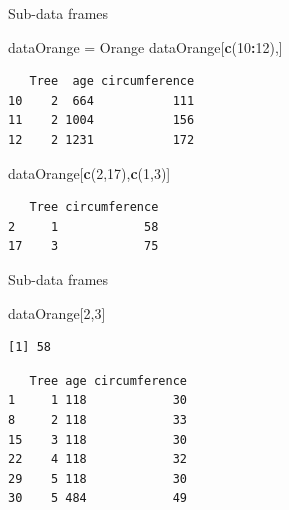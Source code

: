\documentclass[
  ignorenonframetext,
  aspectratio=169]{beamer}
\newenvironment{Shaded}{\begin{snugshade}}{\end{snugshade}}
\newcommand{\DecValTok}[1]{\textcolor[rgb]{0.00,0.00,0.81}{#1}}
\newcommand{\FunctionTok}[1]{\textcolor[rgb]{0.13,0.29,0.53}{\textbf{#1}}}
\newcommand{\NormalTok}[1]{#1}
\newcommand{\OtherTok}[1]{\textcolor[rgb]{0.56,0.35,0.01}{#1}}
\newcommand{\SpecialCharTok}[1]{\textcolor[rgb]{0.81,0.36,0.00}{\textbf{#1}}}
\begin{document}
\begin{frame}[fragile]{Sub-data frames}
\label{sub-data-frames-1}
\begin{Shaded}
\begin{Highlighting}[]
\NormalTok{dataOrange }\OtherTok{=}\NormalTok{ Orange}
\NormalTok{dataOrange[}\FunctionTok{c}\NormalTok{(}\DecValTok{10}\SpecialCharTok{:}\DecValTok{12}\NormalTok{),]}
\end{Highlighting}
\end{Shaded}

\begin{verbatim}
   Tree  age circumference
10    2  664           111
11    2 1004           156
12    2 1231           172
\end{verbatim}

\begin{Shaded}
\begin{Highlighting}[]
\NormalTok{dataOrange[}\FunctionTok{c}\NormalTok{(}\DecValTok{2}\NormalTok{,}\DecValTok{17}\NormalTok{),}\FunctionTok{c}\NormalTok{(}\DecValTok{1}\NormalTok{,}\DecValTok{3}\NormalTok{)]}
\end{Highlighting}
\end{Shaded}

\begin{verbatim}
   Tree circumference
2     1            58
17    3            75
\end{verbatim}
\end{frame}

\begin{frame}[fragile]{Sub-data frames}
\label{sub-data-frames-2}
\begin{Shaded}
\begin{Highlighting}[]
\NormalTok{dataOrange[}\DecValTok{2}\NormalTok{,}\DecValTok{3}\NormalTok{]}
\end{Highlighting}
\end{Shaded}

\begin{verbatim}
[1] 58
\end{verbatim}

\begin{Shaded}
\end{Shaded}

\begin{verbatim}
   Tree age circumference
1     1 118            30
8     2 118            33
15    3 118            30
22    4 118            32
29    5 118            30
30    5 484            49
\end{verbatim}
\end{frame}
\end{document}
